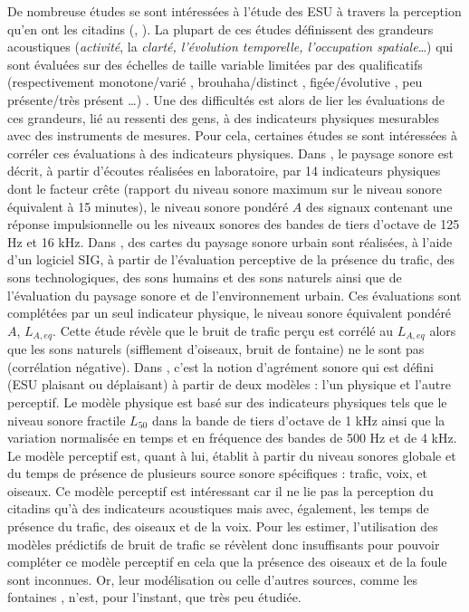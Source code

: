 De nombreuse études se sont intéressées à l'étude des ESU à travers la perception qu'en ont les citadins (\cite{brocolini_measurements_2013},  \cite{hong2013designing}). La plupart de ces études définissent des grandeurs acoustiques (\textit{activité}, la \textit{clarté, l'évolution temporelle, l'occupation spatiale}\dots) qui sont évaluées sur des échelles de taille variable limitées par des qualificatifs (respectivement \og monotone/varié \fg{}, \og brouhaha/distinct \fg{}, \og figée/évolutive \fg{}, \og peu présente/très présent \fg{} \dots) \cite{raimbault2003ambient}.
Une des difficultés est alors de lier les évaluations de ces grandeurs, lié au ressenti des gens, à des indicateurs physiques mesurables avec des instruments de mesures.
Pour cela, certaines études se sont intéressées à corréler ces évaluations à des indicateurs physiques.
Dans \cite{torija2013application}, le paysage sonore est décrit, à partir d'écoutes réalisées en laboratoire, par 14 indicateurs physiques dont le facteur crête (rapport du niveau sonore maximum sur le niveau sonore équivalent à 15 minutes), le niveau sonore pondéré $A$ des signaux contenant une réponse impulsionnelle ou les niveaux sonores des bandes de tiers d'octave de 125 Hz et 16 kHz.
Dans \cite{hong2014soundscape}, des cartes du paysage sonore urbain sont réalisées, à l'aide d'un logiciel SIG, à partir de l'évaluation perceptive de la présence du trafic, des sons technologiques, des sons humains et des sons naturels ainsi que de l'évaluation du paysage sonore et de l'environnement urbain. Ces évaluations sont complétées par un seul indicateur physique, le niveau sonore équivalent pondéré $A$, $L_{A,eq}$. Cette étude révèle que le bruit de trafic perçu est corrélé au $L_{A,eq}$ alors que les sons naturels (sifflement d'oiseaux, bruit de fontaine) ne le sont pas (corrélation négative). Dans \cite{aumond2017modeling}, c'est la notion d'agrément sonore qui est défini (ESU plaisant ou déplaisant) à partir de deux modèles : l'un physique et l'autre perceptif. Le modèle physique est basé sur des indicateurs physiques tels que le niveau sonore fractile $L_{50}$ dans la bande de tiers d'octave de 1 kHz ainsi que la variation normalisée en temps et en fréquence des bandes de 500 Hz et de 4 kHz. Le modèle perceptif est, quant à lui, établit à partir du niveau sonores globale et du temps de présence de plusieurs source sonore spécifiques : trafic, voix, et oiseaux.
Ce modèle perceptif est intéressant car il ne lie pas la perception du citadins qu'à des indicateurs acoustiques mais avec, également, les temps de présence du trafic, des oiseaux et de la voix. Pour les estimer, l'utilisation des modèles prédictifs de bruit de trafic se révèlent donc insuffisants pour pouvoir compléter ce modèle perceptif en cela que la présence des oiseaux et de la foule sont inconnues. Or, leur modélisation \cite{hayne2011prediction} \cite{} ou celle d'autres sources, comme les fontaines \cite{watts2009measurement}, n'est, pour l'instant, que très peu étudiée.
